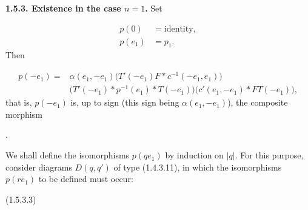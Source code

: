 %
\noindent\textbf{1.5.3. Existence in the case $n=1$.}\quad
Set

\begin{equation}
  \begin{aligned}
    p(0)&=\text{identity},\\
    p(e_1)&=p_1.
  \end{aligned}
  \tag{1.5.3.1}
\end{equation}
Then

\begin{equation}
  \begin{aligned}
    p(-e_1)={}&\alpha(e_1,-e_1)
      \bigl(T'(-e_1)F*c^{-1}(-e_1,e_1)\bigr)\\
      &{}\bigl(T'(-e_1)*p^{-1}(e_1)*T(-e_1)\bigr)
      \bigl(c'(e_1,-e_1)*FT(-e_1)\bigr),
  \end{aligned}
  \tag{1.5.3.2}
\end{equation}
that is, $p(-e_1)$ is, up to sign (this sign being
$\alpha(e_1,-e_1)$), the composite morphism

\begin{center}
  \;.
\end{center}

We shall define the isomorphisms $p(qe_1)$ by induction on $|q|$.
For this purpose, consider diagrams $D(q,q')$ of type (1.4.3.11), in
which the isomorphisms $p(re_1)$ to be defined must occur:

\begin{center}
  \hfill\textup{(1.5.3.3)}
\end{center}

